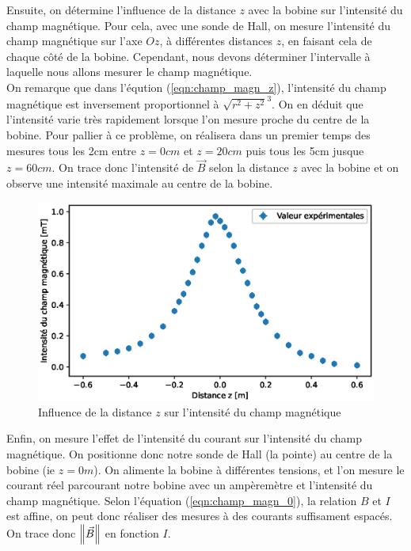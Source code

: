 \documentclass[12pt]{article}
\begin{document}
\newpage
Ensuite, on détermine l'influence de la distance $z$ avec la bobine sur l'intensité du champ magnétique. Pour cela, avec une sonde de Hall, on mesure l'intensité 
du champ magnétique sur l'axe $Oz$, à différentes distances $z$, en faisant cela de chaque côté de la bobine. Cependant, nous devons déterminer l'intervalle à laquelle nous
allons mesurer le champ magnétique. \\
On remarque que dans l'éqution (\ref{eqn:champ_magn_z}), l'intensité du champ magnétique est inversement proportionnel à $\sqrt{r^2 + z^2}^3$.
On en déduit que l'intensité varie très rapidement lorsque l'on mesure proche du centre de la bobine. Pour pallier à ce problème, on réalisera dans un premier temps 
des mesures tous les 2cm entre $z=0cm$ et $z=20cm$ puis tous les 5cm jusque $z=60cm$.
On trace donc l'intensité de $\vec{B}$ selon la distance $z$ avec la bobine et on observe une intensité maximale au centre de la bobine.

\begin{figure}[h!]
    \begin{center}
        \includegraphics[scale=0.6]{img/MagnEnFonctionDeZ.eps}
    \end{center}
    \caption{Influence de la distance $z$ sur l'intensité du champ magnétique}
\end{figure}

Enfin, on mesure l'effet de l'intensité du courant sur l'intensité du champ magnétique. On positionne donc notre
sonde de Hall (la pointe) au centre de la bobine (ie $z=0m$). On alimente la bobine à différentes tensions, et l'on mesure 
le courant réel parcourant notre bobine avec un ampèremètre et l'intensité du champ magnétique. Selon l'équation (\ref{eqn:champ_magn_0}), 
la relation $B$ et $I$ est affine, on peut donc réaliser des mesures à des courants suffisament espacés.
On trace donc $\norm{\vec{B}}$ en fonction $I$.
\end{document}
